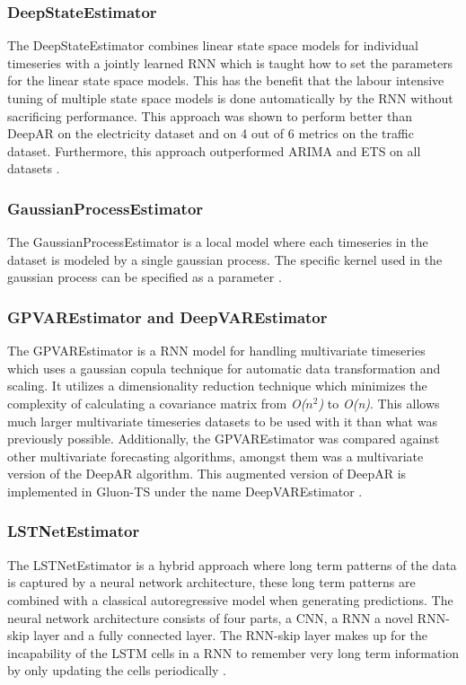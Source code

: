 \subsubsection{DeepStateEstimator}
The DeepStateEstimator combines linear state space models for individual timeseries with a jointly learned RNN which is taught how to set the parameters for the linear state space models. This has the benefit that the labour intensive tuning of multiple state space models is done automatically by the RNN without sacrificing performance. This approach was shown to perform better than DeepAR on the electricity dataset and on 4 out of 6 metrics on the traffic dataset. Furthermore, this approach outperformed ARIMA and ETS on all datasets \cite{rangapuram_deep_2018}.

\subsubsection{GaussianProcessEstimator}
The GaussianProcessEstimator is a local model where each timeseries in the dataset is modeled by a single gaussian process.
The specific kernel used in the gaussian process can be specified as a parameter \cite{gluonts-website}.

\subsubsection{GPVAREstimator and DeepVAREstimator}
\label{algo:gpvar}
The GPVAREstimator is a RNN model for handling multivariate timeseries which uses a gaussian copula technique for automatic data transformation and scaling. It utilizes a dimensionality reduction technique which minimizes the complexity of calculating a covariance matrix from \textit{O($n^2$)} to \textit{O(n)}. This allows much larger multivariate timeseries datasets to be used with it than what was previously possible. Additionally, the GPVAREstimator was compared against other multivariate forecasting algorithms, amongst them was a multivariate version of the DeepAR algorithm. This augmented version of DeepAR is implemented in Gluon-TS under the name DeepVAREstimator \cite{salinas_high-dimensional_2019}.

\subsubsection{LSTNetEstimator}
The LSTNetEstimator is a hybrid approach where long term patterns of the data is captured by a neural network architecture, these long term patterns are combined with a classical autoregressive model when generating predictions. The neural network architecture consists of four parts, a CNN, a RNN a novel RNN-skip layer and a fully connected layer. The RNN-skip layer makes up for the incapability of the LSTM cells in a RNN to remember very long term information by only updating the cells periodically \cite{lai_modeling_2018}.

